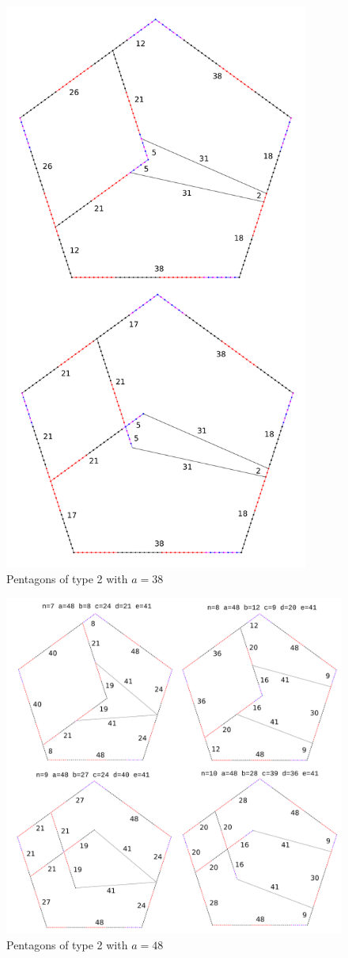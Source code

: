 \documentclass[11pt]{article}
\begin{document}
\begin{figure}
\centering
\includegraphics[width=10cm]{figs/pentagons-2-38}
\caption{Pentagons of type 2 with $a=38$}
\label{pentagons-2-38}
\end{figure}

\begin{figure}
\centering
\includegraphics[width=15cm]{figs/pentagons-2-48}
\caption{Pentagons of type 2 with $a=48$}
\label{pentagons-2-48}
\end{figure}
\end{document}
